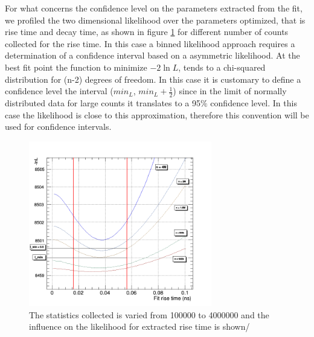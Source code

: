 For what concerns the confidence level on the parameters extracted from the fit, we profiled the two dimensional likelihood over the parameters optimized, that is rise time and decay time, as shown in figure \ref{fig:likelihood} for different number of counts collected for the rise time.
In this case a binned likelihood approach requires a determination of a confidence interval based on a asymmetric likelihood.
At the best fit point the function to minimize  $-2\ln{L}$, tends to a chi-squared distribution for (n-2) degrees of freedom. In this case it is customary to define a confidence level the interval ($min_{L}$, $min_{L}+\frac{1}{2}$) since in the limit of normally distributed data for large counts it translates to a 95$\%$ confidence level. In this case the likelihood is close to this approximation, therefore this convention will be used for confidence intervals.
\begin{figure}[htbp]
\begin{center}
\includegraphics[width=8cm]{../Pictures/Chapter_7/error_rise.png}
\end{center}
\caption[Influence of statistics on likelihhod]{The statistics collected is varied from 100000 to 4000000 and the influence on the likelihood for extracted rise time is shown/}
\label{fig:likelihood}
\end{figure}

